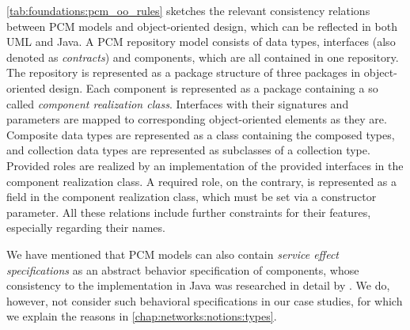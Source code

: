 \autoref{tab:foundations:pcm_oo_rules} sketches the relevant consistency relations between \gls{PCM} models and object-oriented design, which can be reflected in both \gls{UML} and Java.
A \gls{PCM} repository model consists of data types, interfaces (also denoted as \emph{contracts}) and components, which are all contained in one repository.
The repository is represented as a package structure of three packages in object-oriented design.
Each component is represented as a package containing a so called \emph{component realization class}.
Interfaces with their signatures and parameters are mapped to corresponding object-oriented elements as they are.
Composite data types are represented as a class containing the composed types, and collection data types are represented as subclasses of a collection type.
Provided roles are realized by an implementation of the provided interfaces in the component realization class.
A required role, on the contrary, is represented as a field in the component realization class, which must be set via a constructor parameter.
All these relations include further constraints for their features, especially regarding their names.

We have mentioned that \gls{PCM} models can also contain \emph{service effect specifications} as an abstract behavior specification of components, whose consistency to the implementation in Java was researched in detail by \textcite{langhammer2017a}.
We do, however, not consider such behavioral specifications in our case studies, for which we explain the reasons in \autoref{chap:networks:notions:types}.

